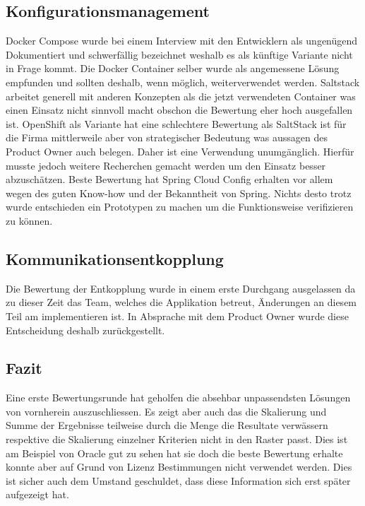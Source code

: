 \subsection{Konfigurationsmanagement}

Docker Compose wurde bei einem Interview mit den Entwicklern als ungenügend Dokumentiert und schwerfällig bezeichnet weshalb es als künftige Variante nicht in Frage kommt. Die Docker Container selber wurde als angemessene Lösung empfunden und sollten deshalb, wenn möglich, weiterverwendet werden. Saltstack arbeitet generell mit anderen Konzepten als die jetzt verwendeten Container was einen Einsatz nicht sinnvoll macht obschon die Bewertung eher hoch ausgefallen ist. OpenShift als Variante hat eine schlechtere Bewertung als SaltStack ist für die Firma mittlerweile aber von strategischer Bedeutung was aussagen des Product Owner auch belegen. Daher ist eine Verwendung unumgänglich. Hierfür musste jedoch weitere Recherchen gemacht werden um den Einsatz besser abzuschätzen. Beste Bewertung hat Spring Cloud Config erhalten vor allem wegen des guten Know-how und der Bekanntheit von Spring. Nichts desto trotz wurde entschieden ein Prototypen zu machen um die Funktionsweise verifizieren zu können.

\subsection{Kommunikationsentkopplung}

Die Bewertung der Entkopplung wurde in einem erste Durchgang ausgelassen da zu dieser Zeit das Team, welches die Applikation betreut, Änderungen an diesem Teil am implementieren ist. In Absprache mit dem Product Owner wurde diese Entscheidung deshalb zurückgestellt.

\subsection{Fazit}

Eine erste Bewertungsrunde hat geholfen die absehbar unpassendsten Lösungen von vornherein auszuschliessen. Es zeigt aber auch das die Skalierung und Summe der Ergebnisse teilweise durch die Menge die Resultate verwässern respektive die Skalierung einzelner Kriterien nicht in den Raster passt. Dies ist am Beispiel von Oracle gut zu sehen hat sie doch die beste Bewertung erhalte konnte aber auf Grund von Lizenz Bestimmungen nicht verwendet werden. Dies ist sicher auch dem Umstand geschuldet, dass diese Information sich erst später aufgezeigt hat.

